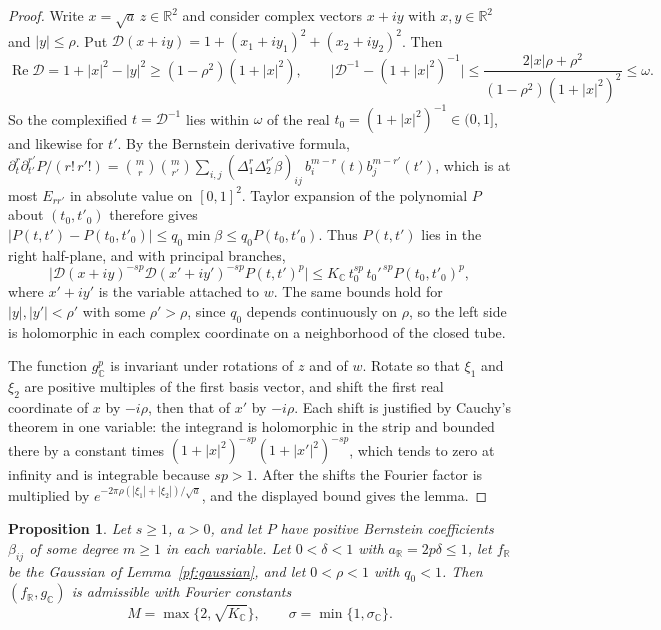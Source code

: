 \documentclass[11pt]{amsart}
\numberwithin{equation}{section}
\newtheorem{proposition}[equation]{Proposition}
\theoremstyle{definition}
\theoremstyle{remark}
\newcommand{\R}{\mathbb R}
\newcommand{\C}{\mathbb C}
\begin{document}
\begin{proof}
Write $x=\sqrt a\,z\in\R^2$ and consider complex vectors $x+iy$ with
$x,y\in\R^2$ and $|y|\le\rho$. Put
$\mathcal D(x+iy)=1+(x_1+iy_1)^2+(x_2+iy_2)^2$. Then
\[
 \operatorname{Re}\mathcal D=1+|x|^2-|y|^2\ge(1-\rho^2)(1+|x|^2),\qquad
 \bigl|\mathcal D^{-1}-(1+|x|^2)^{-1}\bigr|
 \le\frac{2|x|\rho+\rho^2}{(1-\rho^2)(1+|x|^2)^2}\le\omega .
\]
So the complexified $t=\mathcal D^{-1}$ lies within $\omega$ of the real
$t_0=(1+|x|^2)^{-1}\in(0,1]$, and likewise for $t'$. By the Bernstein
derivative formula,
$\partial_t^r\partial_{t'}^{r'}P/(r!\,r'!)=\binom mr\binom m{r'}
\sum_{i,j}(\Delta_1^r\Delta_2^{r'}\beta)_{ij}\,b_i^{m-r}(t)b_j^{m-r'}(t')$,
which is at most $E_{rr'}$ in absolute value on $[0,1]^2$. Taylor
expansion of the polynomial $P$ about $(t_0,t'_0)$ therefore gives
$|P(t,t')-P(t_0,t'_0)|\le q_0\min\beta\le q_0P(t_0,t'_0)$. Thus
$P(t,t')$ lies in the right half-plane, and with principal branches,
\[
 \bigl|\mathcal D(x+iy)^{-sp}\mathcal D(x'+iy')^{-sp}P(t,t')^p\bigr|
 \le K_\C\,t_0^{sp}\,t_0'^{\,sp}P(t_0,t'_0)^p ,
\]
where $x'+iy'$ is the variable attached to $w$. The same bounds hold
for $|y|,|y'|<\rho'$ with some $\rho'>\rho$, since $q_0$ depends
continuously on $\rho$, so the left side is holomorphic in each complex
coordinate on a neighborhood of the closed tube.

The function $g_\C^p$ is invariant under rotations of $z$ and of $w$.
Rotate so that $\xi_1$ and $\xi_2$ are positive multiples of the first
basis vector, and shift the first real coordinate of $x$ by $-i\rho$,
then that of $x'$ by $-i\rho$. Each shift is justified by Cauchy's
theorem in one variable: the integrand is holomorphic in the strip and
bounded there by a constant times $(1+|x|^2)^{-sp}(1+|x'|^2)^{-sp}$,
which tends to zero at infinity and is integrable because $sp>1$. After
the shifts the Fourier factor is multiplied by
$e^{-2\pi\rho(|\xi_1|+|\xi_2|)/\sqrt a}$, and the displayed bound gives
the lemma.
\end{proof}

\begin{proposition}\label{pf:admissible}
Let $s\ge1$, $a>0$, and let $P$ have positive Bernstein coefficients
$\beta_{ij}$ of some degree $m\ge1$ in each variable. Let $0<\delta<1$ with
$a_\R=2p\delta\le1$, let $f_\R$ be the Gaussian of
Lemma~\ref{pf:gaussian}, and let $0<\rho<1$ with $q_0<1$. Then
$(f_\R,g_\C)$ is admissible with Fourier constants
\begin{equation}\label{pf:polynomial-fourier-contract}
 M=\max\{2,\sqrt{K_\C}\},\qquad \sigma=\min\{1,\sigma_\C\}.
\end{equation}
\end{proposition}
\end{document}
